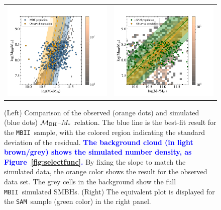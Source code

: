 \documentclass[twocolumn,trackchanges]{aastex63}
\newcommand{\mbh}{$\mathcal M_{\rm BH}$}
\newcommand{\mstar}{{$M_*$}}
\newcommand{\sam}{\texttt{SAM}}
\newcommand{\mbii}{\texttt{MBII}}
\newcommand{\blue}[1]{{\textcolor{blue}{\bf #1}}}
\begin{document}
\begin{figure}[t]%
\begin{tabular}{c c}
\includegraphics[trim = 0mm 0mm 65mm 0mm, clip, width=0.47\linewidth]{MBII_MM.png} &
\includegraphics[trim = 0mm 0mm 65mm 0mm, clip, width=0.47\linewidth]{SAM_MM_consider_nois.png} \\
\end{tabular}
\caption{(Left) Comparison of the observed (orange dots) and simulated (blue dots) \mbh--\mstar\ relation. The blue line is the best-fit result for the \mbii\ sample, with the colored region indicating the standard deviation of the residual. \blue{The background cloud (in light brown/grey) shows the simulated number density, as Figure~\ref{fig:selectfunc}.} By fixing the slope to match the simulated data, the orange color shows the result for the observed data set. The grey cells in the background show the full \mbii\ simulated SMBHs. (Right) The equivalent plot is displayed for the \sam\ sample (green color) in the right panel.}
\label{fig:MM_comp}
\end{figure}
\end{document}
